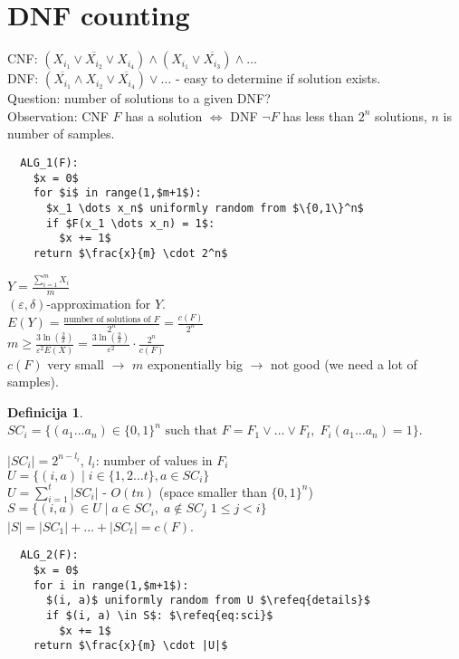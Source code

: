 \documentclass[a4paper, 12pt]{book}
\theoremstyle{definition}
\newtheorem{defn}[counter]{Definicija}
\theoremstyle{remark}
\begin{document}
\section{DNF counting}

CNF: $(X_{i_1} \lor \overline{X_{i_2}} \lor X_{i_4}) \land (X_{i_1} \lor \overline{X_{i_3}}) \land \dots$ \\
DNF: $(\overline{X_{i_1}} \land X_{i_2} \lor \overline{X_{i_4}}) \lor \dots$
- easy to determine if solution exists. \\
Question: number of solutions to a given DNF? \\
Observation: CNF $F$ has a solution $\iff$ DNF $\neg F$ has less than $2^n$ solutions, $n$ is number of samples.
\begin{lstlisting}
  ALG_1(F):
    $x = 0$
    for $i$ in range(1,$m+1$):
      $x_1 \dots x_n$ uniformly random from $\{0,1\}^n$
      if $F(x_1 \dots x_n) = 1$:
        $x += 1$
    return $\frac{x}{m} \cdot 2^n$
\end{lstlisting}
$Y = \frac{\sum_{i=1}^{m} X_i}{m}$ \\
$(\varepsilon,\delta)$-approximation for $Y$. \\
$E(Y) = \frac{\text{number of solutions of }F}{2^n} = \frac{c(F)}{2^n}$ \\
$m \geq \frac{3 \ln\left(\frac{2}{\delta}\right)}{\varepsilon^2 E(X)} =
\frac{3 \ln\left(\frac{2}{\delta}\right)}{\varepsilon^2} \cdot \frac{2^n}{c(F)}$ \\
$c(F)$ very small $\to$ $m$ exponentially big $\to$ not good (we need a lot of samples).
\begin{defn} \text{} \\
  $SC_i = \{(a_1 \dots a_n) \in \{0,1\}^n \text{ such that } F = F_1 \lor \dots \lor F_t, \; F_i(a_1 \dots a_n) = 1\}$.
\end{defn}
$|SC_i| = 2^{n-l_i}$, $l_i$: number of values in $F_i$ \\
$U = \{(i,a) \mid i \in \{1,2 \dots t\}, a \in SC_i\}$ \\
$U = \sum_{i=1}^{t} |SC_i|$ - $O(tn)$ (space smaller than $\{0,1\}^n$) \\
$S = \{(i,a) \in U \mid a \in SC_i, \; a \not \in SC_j \; 1 \leq j < i\}$ \\
$|S| = |SC_1| + \dots + |SC_t| = c(F)$.
\begin{lstlisting}
  ALG_2(F):
    $x = 0$
    for i in range(1,$m+1$):
      $(i, a)$ uniformly random from U $\refeq{details}$
      if $(i, a) \in S$: $\refeq{eq:sci}$
        $x += 1$
    return $\frac{x}{m} \cdot |U|$
\end{lstlisting}
\end{document}
